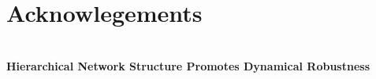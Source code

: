 

% 

\section*{Acknowlegements}






\pagebreak
\FloatBarrier

\onecolumngrid
\pagebreak


\pagebreak
\twocolumngrid

\pagebreak
\FloatBarrier

\beginsupplement
\setcounter{secnumdepth}{4}


\begin{widetext}
\begin{center}
\\
\textbf{\large Hierarchical Network Structure Promotes Dynamical Robustness}\\
\\
\end{center}
\end{widetext}






